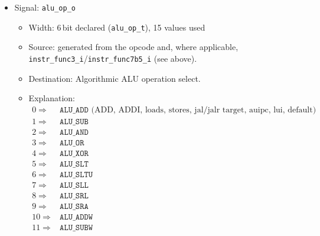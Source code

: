 \begin{itemize}
\begin{itemize}
\[\begin{array}{ll}
                                              \texttt{IMM\_U}=4 \Rightarrow & \mbox{U-type (lui, auipc)} \\
                                              \texttt{IMM\_J}=5 \Rightarrow & \mbox{J-type (jal)}
                                              \end{array} \]
  \end{itemize}
  \item Signal: \texttt{alu\_op\_o}
  \begin{itemize}
    \item Width: 6\,bit declared (\texttt{alu\_op\_t}), 15 values used
    \item Source: generated from the opcode and, where applicable,
      \texttt{instr\_func3\_i}/\texttt{instr\_func7b5\_i} (see above).
    \item Destination: Algorithmic ALU operation select.
    \item Explanation: \[ \begin{array}{ll}
                                              0 \Rightarrow & \texttt{ALU\_ADD} \mbox{ (ADD, ADDI, loads, stores, jal/jalr target, auipc, lui, default)} \\
                                              1 \Rightarrow & \texttt{ALU\_SUB} \\
                                              2 \Rightarrow & \texttt{ALU\_AND} \\
                                              3 \Rightarrow & \texttt{ALU\_OR} \\
                                              4 \Rightarrow & \texttt{ALU\_XOR} \\
                                              5 \Rightarrow & \texttt{ALU\_SLT} \\
                                              6 \Rightarrow & \texttt{ALU\_SLTU} \\
                                              7 \Rightarrow & \texttt{ALU\_SLL} \\
                                              8 \Rightarrow & \texttt{ALU\_SRL} \\
                                              9 \Rightarrow & \texttt{ALU\_SRA} \\
                                              10 \Rightarrow & \texttt{ALU\_ADDW} \\
                                              11 \Rightarrow & \texttt{ALU\_SUBW} \\

\end{array}\]
\end{itemize}
\end{itemize}

